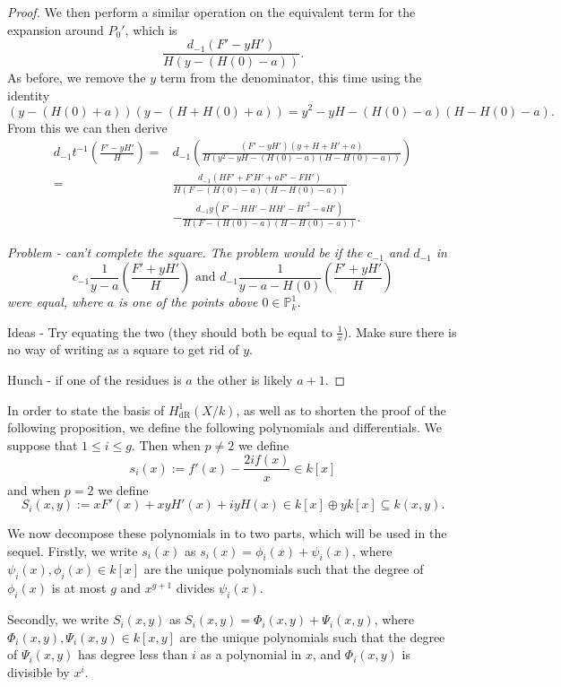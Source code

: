 \documentclass[draft, 11pt]{article} %
\theoremstyle{plain}
\theoremstyle{remark}
\newcommand{\derhamhone}{H_{\text {dR}}^1(X/k)}
\begin{document}
\begin{proof}
We then perform a similar operation on the equivalent term for the expansion around $P_0'$, which is
\[
\frac{d_{-1}(F' - yH')}{H(y - (H(0) - a))}.
\]
As before, we remove the $y$ term from the denominator, this time using the identity
\[
(y-(H(0)+a))(y - (H+H(0)+a)) = y^2 - yH - (H(0) - a)(H - H(0) - a).
\]
From this we can then derive 
\begin{align*}
d_{-1}t^{-1} \left( \frac{F' - yH'}{H} \right)  = & d_{-1}\left( \frac{(F'  - yH')(y+ H + H' + a)}{H(y^2 - yH -(H(0)-a)(H - H(0) -a ))} \right) \\
 =&  \frac{d_{-1}(HF' + F'H' + aF' - FH')}{H(F-(H(0) - a)(H - H(0) - a))}  \\
& - \frac{d_{-1}y(F'  - HH' - HH' - {H'}^2 - aH')}{H(F - (H(0) - a)( H - H(0) - a))}.
\end{align*}



{\sl Problem - can't complete the square. The problem would be if the $c_{-1}$ and $d_{-1}$ in 
\[
c_{-1}\frac{1}{y-a}\left(\frac{F'+yH'}{H}\right) \text{ and } d_{-1}\frac{1}{y-a-H(0)}\left(\frac{F'+yH'}{H}\right)
\]
were equal, where $a$ is one of the points above $0\in \mathbb P_k^1$.

Ideas - Try equating the two (they should both be equal to $\frac{1}{x}$).
Make sure there is no way of writing as a square to get rid of $y$.

Hunch - if one of the residues is $a$ the other is likely $a+1$.}
\end{proof}



In order to state the basis of $\derhamhone$, as well as to shorten the proof of the following proposition, we define the following polynomials and differentials. 
We suppose that $1 \leq i \leq g$.
Then when $p\neq 2$ we define
\[
s_i(x) := f'(x) - \frac{2if(x)}{x} \in k[x]
\]
and when $p = 2$ we define
\begin{equation}\label{capitals}
S_i(x,y) := xF'(x) + xyH'(x) + iyH(x)\in k[x]\oplus yk[x] \subseteq k(x,y).
\end{equation}

We now decompose these polynomials in to two parts, which will be used in the sequel.
Firstly, we write $s_i(x)$ as $s_i(x) = \phi_i(x) + \psi_i(x)$, where $\psi_i(x), \phi_i(x) \in k[x]$ are the unique polynomials such that the degree of $\phi_i (x)$ is at most $g$ and $x^{g+1}$ divides $\psi_i(x)$.



Secondly, we write $S_i(x,y)$ as $S_i(x,y) = \Phi_i(x,y) + \Psi_i(x,y)$, where $\Phi_i(x,y), \Psi_i(x,y) \in k[x,y]$ are the unique polynomials such that the degree of $\Psi_i(x,y)$ has degree less than $i$ as a polynomial in $x$, and $\Phi_i(x,y)$ is divisible by $x^i$.
\end{document}
